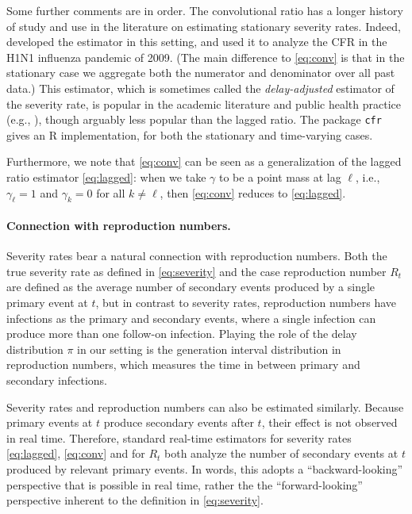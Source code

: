 \documentclass{article}
\begin{document}
Some further comments are in order. The convolutional ratio has a longer history
of study and use in the literature on estimating stationary severity
rates. Indeed, \citet{nishiura} developed the estimator in this setting,  
and used it to analyze the CFR in the H1N1 influenza pandemic of 2009. (The main 
difference to \eqref{eq:conv} is that in the stationary case we aggregate both
the numerator and denominator over all past data.) This estimator, which is
sometimes called the \emph{delay-adjusted} estimator of the severity rate, is
popular in the academic literature and public health practice (e.g., 
\citealp{nishiuraEx1, nishiuraEx2, Russell2020, Unnikrishnan2021}), though   
arguably less popular than the lagged ratio. The package \texttt{cfr}
\citep{cfr_package} gives an R implementation, for both the stationary and
time-varying cases.  

Furthermore, we note that \eqref{eq:conv} can be seen as a generalization of the  
lagged ratio estimator \eqref{eq:lagged}: when we take $\gamma$ to be a point
mass at lag $\ell$, i.e., $\gamma_\ell = 1$ and $\gamma_k = 0$ for all $k \not=
\ell$, then \eqref{eq:conv} reduces to \eqref{eq:lagged}.   

\paragraph{Connection with reproduction numbers.} 

Severity rates bear a natural connection with reproduction numbers. Both the
true severity rate as defined in \eqref{eq:severity} and the case reproduction
number $R_t$ are defined as the average number of secondary events produced by a
single primary event at $t$, but in contrast to severity rates, reproduction
numbers have infections as the primary and secondary events, where a single
infection can produce more than one follow-on infection. Playing the role of the
delay distribution $\pi$ in our setting is the generation interval distribution
in reproduction numbers, which measures the time in between primary and
secondary infections.  

Severity rates and reproduction numbers can also be estimated similarly. Because
primary events at $t$ produce secondary events after $t$, their effect is not
observed in real time. Therefore, standard real-time estimators for severity
rates \eqref{eq:lagged}, \eqref{eq:conv} and for $R_t$ both analyze the number
of  secondary events at $t$ produced by relevant primary events. In words, this 
adopts a ``backward-looking'' perspective that is possible in real time, rather the 
the ``forward-looking'' perspective inherent to the definition in
\eqref{eq:severity}. 
\end{document}
